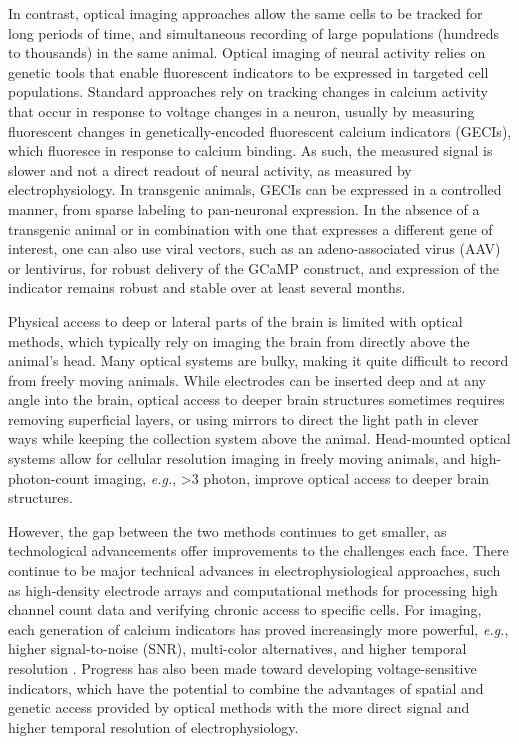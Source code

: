 In contrast, optical imaging approaches allow the same cells to be tracked for long periods of time, and simultaneous recording of large populations (hundreds to thousands) in the same animal. Optical imaging of neural activity relies on genetic tools that enable fluorescent indicators to be expressed in targeted cell populations. Standard approaches rely on tracking changes in calcium activity that occur in response to voltage changes in a neuron, usually by measuring fluorescent changes in genetically-encoded fluorescent calcium indicators (GECIs)\cite{Akerboom2012, Chen2013Ultrasensitive}, which fluoresce in response to calcium binding. As such, the measured signal is slower and not a direct readout of neural activity, as measured by electrophysiology. In transgenic animals, GECIs can be expressed in a controlled manner, from sparse labeling to pan-neuronal expression. In the absence of a transgenic animal or in combination with one that expresses a different gene of interest, one can also use viral vectors, such as an adeno-associated virus (AAV) or lentivirus, for robust delivery of the GCaMP construct, and expression of the indicator remains robust and stable over at least several months.

Physical access to deep or lateral parts of the brain is limited with optical methods, which typically rely on imaging the brain from directly above the animal's head. Many optical systems are bulky, making it quite difficult to record from freely moving animals. While electrodes can be inserted deep and at any angle into the brain, optical access to deeper brain structures sometimes requires removing superficial layers, or using mirrors to direct the light path in clever ways while keeping the collection system above the animal\cite{Andermann2013}. Head-mounted optical systems allow for cellular resolution imaging in freely moving animals\cite{Helmchen2001, Sawinski2009}, and high-photon-count imaging, \textit{e.g.}, >3 photon\cite{Klioutchnikov2020}, improve optical access to deeper brain structures.

However, the gap between the two methods continues to get smaller, as technological advancements offer improvements to the challenges each face. There continue to be major technical advances in electrophysiological approaches, such as high-density electrode arrays and computational methods for processing high channel count data and verifying chronic access to specific cells. For imaging, each generation of calcium indicators has proved increasingly more powerful, \textit{e.g.}, higher signal-to-noise (SNR), multi-color alternatives, and higher temporal resolution \cite{Akerboom2012, Chen2013Ultrasensitive}. Progress has also been made toward developing voltage-sensitive indicators\cite{Bando2019, Villette2019}, which have the potential to combine the advantages of spatial and genetic access provided by optical methods with the more direct signal and higher temporal resolution of electrophysiology.

